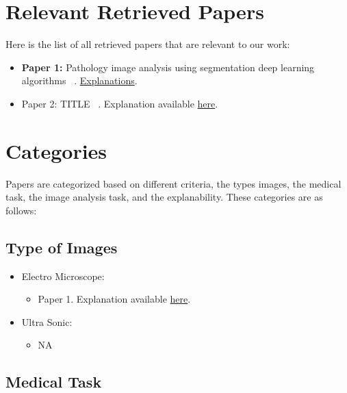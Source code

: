 \clearpage
\section{Relevant Retrieved Papers}
\label{rel_papers}

Here is the list of all retrieved papers that are relevant to our work:

\begin{itemize}
\item {\bf Paper 1:} Pathology image analysis using segmentation deep learning algorithms ~\cite{wang2019pathology}. \hyperref[p1]{Explanations}. 

\item Paper 2: TITLE ~\cite{wang2019pathology}. Explanation available \hyperref[p2]{here}. 

\end{itemize}


\clearpage
\section{Categories}
\label{cat}

Papers are categorized based on different criteria, the types images, the medical task, the image analysis task, and the explanability. These categories are as follows:

\subsection{Type of Images}

\begin{itemize}

	\item \label{c_ti_1} Electro Microscope:
	\begin{itemize}
		\item Paper 1. Explanation available \hyperref[p1]{here}.
	\end{itemize}
	
	\item \label{c_ti_2} Ultra Sonic:
	\begin{itemize}
		\item NA
	\end{itemize}
	
\end{itemize}

\subsection{Medical Task}


